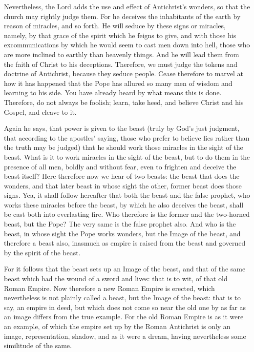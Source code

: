 Nevertheless, the Lord adds the use and effect of Antichrist’s wonders, so that the church may rightly judge them. For he deceives the inhabitants of the earth by reason of miracles, and so forth. He will seduce by these signs or miracles, namely, by that grace of the spirit which he feigns to give, and with those his excommunications by which he would seem to cast men down into hell, those who are more inclined to earthly than heavenly things. And he will lead them from the faith of Christ to his deceptions. Therefore, we must judge the tokens and doctrine of Antichrist, because they seduce people. Cease therefore to marvel at how it has happened that the Pope has allured so many men of wisdom and learning to his side. You have already heard by what means this is done. Therefore, do not always be foolish; learn, take heed, and believe Christ and his Gospel, and cleave to it.

Again he says, that power is given to the beast (truly by God’s just judgment, that according to the apostles’ saying, those who prefer to believe lies rather than the truth may be judged) that he should work those miracles in the sight of the beast. What is it to work miracles in the sight of the beast, but to do them in the presence of all men, boldly and without fear, even to frighten and deceive the beast itself? Here therefore now we hear of two beasts: the beast that does the wonders, and that later beast in whose sight the other, former beast does those signs. Yea, it shall follow hereafter that both the beast and the false prophet, who works these miracles before the beast, by which he also deceives the beast, shall be cast both into everlasting fire. Who therefore is the former and the two-horned beast, but the Pope? The very same is the false prophet also. And who is the beast, in whose sight the Pope works wonders, but the Image of the beast, and therefore a beast also, inasmuch as empire is raised from the beast and governed by the spirit of the beast.

For it follows that the beast sets up an Image of the beast, and that of the same beast which had the wound of a sword and lives: that is to wit, of that old Roman Empire. Now therefore a new Roman Empire is erected, which nevertheless is not plainly called a beast, but the Image of the beast: that is to say, an empire in deed, but which does not come so near the old one by as far as an image differs from the true example. For the old Roman Empire is as it were an example, of which the empire set up by the Roman Antichrist is only an image, representation, shadow, and as it were a dream, having nevertheless some similitude of the same.

